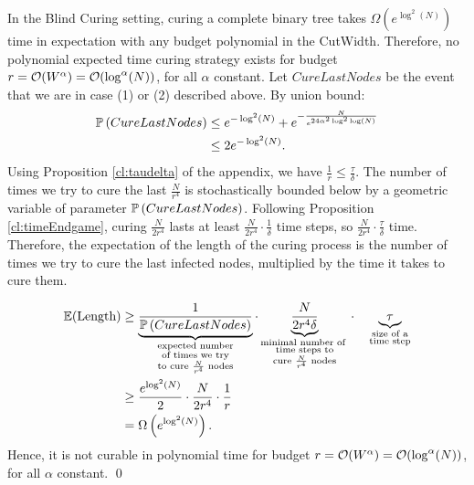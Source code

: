 \begin{theorem} \label{th:BlindCuring} 
In the Blind Curing setting, curing a complete binary tree takes $\Omega \left(   e^{\log^2(N)}  \right)  $ time in expectation with any budget polynomial in the {\sc CutWidth}. Therefore, no polynomial expected time curing strategy exists for budget $r=\mathcal{O}(W^\alpha) = \mathcal{O}(\log^\alpha(N))$, for all $\alpha$ constant.
\proof Let $CureLastNodes$ be the event that we are in case (1) or (2) described above. By union bound:
\begin{align*}
\mathbb{P} \left(CureLastNodes\right) &\leq e^{-\log^2(N)} + e^{-\frac{N}{e^{24\alpha^2\log^2\log(N)}}} \\
	&\leq 2e^{-\log^2(N)}.
\end{align*}
Using Proposition \ref{cl:taudelta} of the appendix, we have $\frac{1}{r} \leq \frac{\tau}{\delta}$. The number of times we try to cure the last $\frac{N}{r^4}$ is stochastically bounded below by a geometric variable of parameter $\mathbb{P} \left(CureLastNodes\right)$. Following Proposition \ref{cl:timeEndgame}, curing $\frac{N}{2r^4}$ lasts at least $\frac{N}{2r^4} \cdot \frac{1}{\delta}$ time steps, so $\frac{N}{2r^4}\cdot \frac{\tau}{\delta}$ time. Therefore, the expectation of the length of the curing process is the number of times we try to cure the last infected nodes, multiplied by the time it takes to cure them.

\begin{align*}
\mathbb{E}(\text{Length}) 
&\geq \underbrace{\frac{1}{\mathbb{P} \left(CureLastNodes\right) }}_{\substack{\text{expected number} \\ \text{of times we try}  \\ \text{to cure $\frac{N}{r^4}$ nodes}}} \cdot  \underbrace{\frac{N}{2r^4\delta}}_{\substack{\text{minimal number of } \\ \text{time steps to}  \\ \text{cure $\frac{N}{r^4}$ nodes}}} \cdot \quad \underbrace{\tau}_{\substack{\text{size of a} \\ \text{time step}}} \\
&\geq \frac{e^{\log^2(N)}}{2}  \cdot \frac{N}{2r^4} \cdot \frac{1}{r} \\
&= \Omega \left( e^{\log^2(N)} \right).
\end{align*} 
Hence, it is not curable in polynomial time for budget $r=\mathcal{O}(W^\alpha) = \mathcal{O}(\log^\alpha(N))$, for all $\alpha$ constant. \qed 
\end{theorem}



